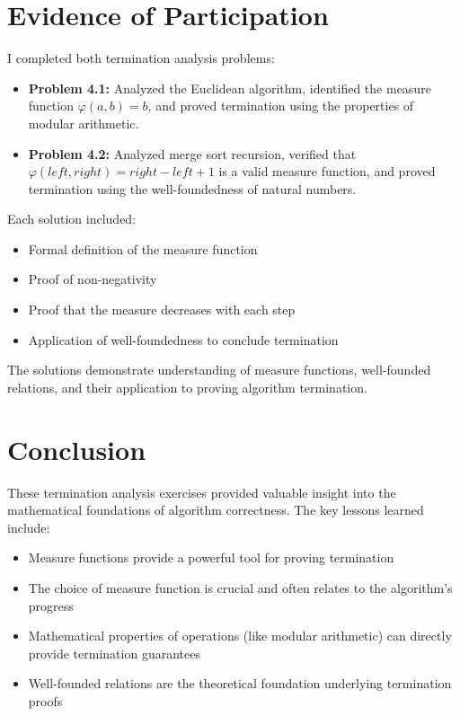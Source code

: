 \documentclass{article}
\theoremstyle{plain}
\theoremstyle{definition}
\theoremstyle{remark}
\begin{document}
\section{Evidence of Participation}

I completed both termination analysis problems:

\begin{itemize}
\item \textbf{Problem 4.1:} Analyzed the Euclidean algorithm, identified the measure function $\varphi(a,b) = b$, and proved termination using the properties of modular arithmetic.
\item \textbf{Problem 4.2:} Analyzed merge sort recursion, verified that $\varphi(left, right) = right - left + 1$ is a valid measure function, and proved termination using the well-foundedness of natural numbers.
\end{itemize}

Each solution included:
\begin{itemize}
\item Formal definition of the measure function
\item Proof of non-negativity
\item Proof that the measure decreases with each step
\item Application of well-foundedness to conclude termination
\end{itemize}

The solutions demonstrate understanding of measure functions, well-founded relations, and their application to proving algorithm termination.

\section{Conclusion}\label{conclusion}

These termination analysis exercises provided valuable insight into the mathematical foundations of algorithm correctness. The key lessons learned include:

\begin{itemize}
\item Measure functions provide a powerful tool for proving termination
\item The choice of measure function is crucial and often relates to the algorithm's progress
\item Mathematical properties of operations (like modular arithmetic) can directly provide termination guarantees
\item Well-founded relations are the theoretical foundation underlying termination proofs
\end{itemize}
\end{document}
